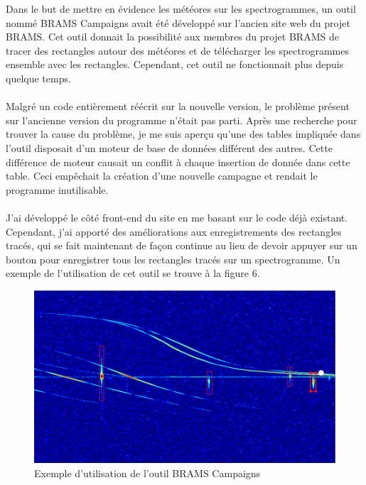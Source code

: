 \documentclass[11pt]{article}
\begin{document}
Dans le but de mettre en évidence les météores sur les spectrogrammes, un outil nommé BRAMS Campaigns avait été développé sur l'ancien site web du projet BRAMS.
Cet outil donnait la possibilité aux membres du projet BRAMS de tracer des rectangles autour des météores et de télécharger les spectrogrammes ensemble avec les rectangles.
Cependant, cet outil ne fonctionnait plus depuis quelque temps.\\
\\
Malgré un code entièrement réécrit sur la nouvelle version, le problème présent sur l'ancienne version du programme n'était pas parti.
Après une recherche pour trouver la cause du problème, je me suis aperçu qu'une des tables impliquée dans l'outil disposait d'un moteur de base de données différent des autres.
Cette différence de moteur causait un conflit à chaque insertion de donnée dans cette table.
Ceci empêchait la création d'une nouvelle campagne et rendait le programme inutilisable.\\
\\
J'ai développé le côté front-end du site en me basant sur le code déjà existant.
Cependant, j'ai apporté des améliorations aux enregistrements des rectangles tracés, qui se fait maintenant de façon continue au lieu de devoir appuyer sur un bouton pour enregistrer tous les rectangles tracés sur un spectrogramme.
Un exemple de l'utilisation de cet outil se trouve à la figure 6.

\begin{figure}[t]
    \begin{center}
        \includegraphics[scale=0.85]{campaigns.png}
        \caption{Exemple d'utilisation de l'outil BRAMS Campaigns}
    \end{center}
\end{figure}
\end{document}
